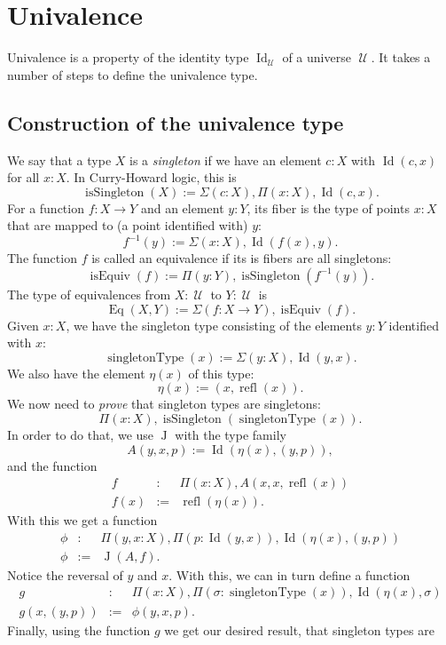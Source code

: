 \documentclass{article}
\newcommand{\Id}{\operatorname{Id}}
\newcommand{\J}{\operatorname{J}}
\newcommand{\refl}{\operatorname{refl}}
\newcommand{\U}{\operatorname{\mathcal{U}}}
\newcommand{\isSingleton}{\operatorname{isSingleton}}
\newcommand{\isEquiv}{\operatorname{isEquiv}}
\newcommand{\Eq}{\operatorname{Eq}}
\newcommand{\singletonType}{\operatorname{singletonType}}
\begin{document}
\section{Univalence}

Univalence is a property of the identity type $\Id_{\U}$ of a universe $\U$. It
takes a number of steps to define the univalence type.

\subsection{Construction of the univalence type}

We say that a type $X$ is a \emph{singleton} if we have an element $c:X$ with
$\Id(c,x)$ for all $x:X$. In Curry-Howard logic, this is
\[
    \isSingleton(X) := \Sigma(c:X), \Pi(x:X), \Id(c,x).
\]
For a function $f:X\to Y$ and an element $y:Y$, its fiber is the type of
points $x:X$ that are mapped to (a point identified with) $y$:
\[
    f^{-1}(y) := \Sigma(x:X),\Id(f(x),y).
\]
The function $f$ is called an equivalence if its is fibers are all
singletons:
\[
    \isEquiv(f) := \Pi(y:Y), \isSingleton(f^{-1}(y)).
\]
The type of equivalences from $X:\U$ to $Y:\U$ is
\[
    \Eq(X,Y) := \Sigma(f:X\to Y), \isEquiv(f).
\]
Given $x:X$, we have the singleton type consisting of the elements $y:Y$
identified with $x$:
\[
   \singletonType(x) := \Sigma(y:X), \Id(y,x).
\]
We also have the element $\eta(x)$ of this type:
\[
   \eta(x) := (x, \refl(x)).
\]
We now need to \emph{prove} that singleton types are singletons:
\[
   \Pi(x:X), \isSingleton(\singletonType(x)).
\]
In order to do that, we use $\J$ with the type family
\[
   A(y,x,p) := \Id(\eta(x),(y,p)),
\]
and the function 
\begin{eqnarray*}
  f & : & \Pi(x:X), A(x,x,\refl(x)) \\
   f(x) & := & \refl(\eta(x)).
\end{eqnarray*}
With this we get a function
\begin{eqnarray*}
   \phi & : & \Pi(y,x:X), \Pi(p:\Id(y,x)), \Id(\eta(x),(y,p)) \\
   \phi & := & \J(A,f).
\end{eqnarray*}
Notice the reversal of $y$ and $x$.
%
With this, we can in turn define a function
\begin{eqnarray*}
   g & : & \Pi(x:X), \Pi(\sigma :\singletonType(x)), \Id(\eta(x),\sigma ) \\
   g(x,(y,p)) & := & \phi(y,x,p).
\end{eqnarray*}
Finally, using the function $g$ we get our desired result, that singleton types are
\end{document}
